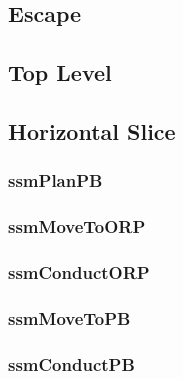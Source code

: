 \documentclass[../../main/main.tex]{subfiles}
\begin{document}
\subsection{Escape}\label{ssec:escape}

\subsection{Top Level}\label{ssec:toplevel}

\subsection{Horizontal Slice}\label{ssec:horizontalslice}

\subsubsection{ssmPlanPB}\label{sssec:ssmPlanPB}

\subsubsection{ssmMoveToORP}\label{sssec:ssmMoveToORP}

\subsubsection{ssmConductORP}\label{sssec:ssmConductORP}

\subsubsection{ssmMoveToPB}\label{sssec:ssmMoveToPB}

\subsubsection{ssmConductPB}\label{sssec:ssmConductPB}
\end{document}
